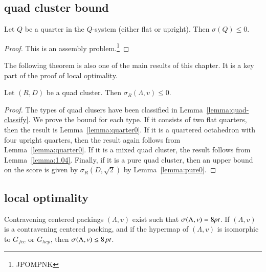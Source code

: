 \subsection{quad cluster bound}

\begin{lemma} \label{lemma:quarter0}
Let $Q$ be a quarter in the $Q$-system (either flat or upright).
Then $\sigma(Q)\le 0$. 
\end{lemma}

\begin{proof} This is an assembly problem.\footnote{JPOMPNK}
\end{proof}


The following theorem is also one of the main results of this
chapter. It is a key part of the proof of local optimality.


\begin{theorem}\label{lemma:quad0} Let $(R,D)$ be a quad cluster.
Then $\sigma_R(\Lambda,v)\le 0$.
\end{theorem}

\begin{proof}
The types of quad clusers have been classified in Lemma~\ref{lemma:quad-classify}.
We prove the bound for each type.
If it consists of two flat quarters, then the result is
Lemma~\ref{lemma:quarter0}.  If it is a quartered octahedron with
four upright quarters, then the result again follows from
Lemma~\ref{lemma:quarter0}.  If it is a mixed quad cluster,
the result follows from Lemma~\ref{lemma:1.04}.  Finally,
if it is a pure quad cluster, then an upper bound on the score
is given by $\sigma_R(D,\sqrt2)$ by Lemma~\ref{lemma:pure0}.  
\end{proof}







\subsection{local optimality}%
\label{sec:local-opt}

\begin{lemma}  %
Contravening centered packings $(\Lambda,v)$ exist such that
$\sigma(\Lambda,v)=8\hbox{\it pt}$. If $(\Lambda,v)$ is a contravening centered packing, and
if the hypermap of $(\Lambda,v)$ is isomorphic to $G_{fcc}$ or $G_{hcp}$,
then $\sigma(\Lambda,v) \le 8\,\hbox{\it pt}$.
\end{lemma} %

